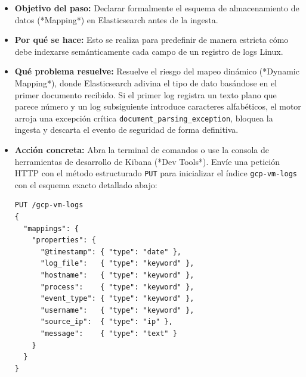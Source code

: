 \documentclass[
  coursetitle={Cómputo Nube y Tecnologías Emergentes},
  coursehours={96},
  coursedate={Verano 2026},
  doctype={Práctica},
  otherlangs={english,french},
  authorname={Lázaro},
  authorsurname={Bustio-Martínez},
  authortitle={PhD},
  role={Profesor Investigador},
  email={lbustio@inaoe.mx},
  phone={5559504000},
  ext={7459},
  institution={Instituto Nacional de Astrofísica, Óptica y Electrónica (INAOE)},
  department={Maestría en Ciencias en Tecnologías de Seguridad},
  address={Luis Enrique Erro 1, Sta. Ma. Tonantzintla, San Andrés Cholula, CP 72840, Puebla, México},
  margin={0.5in}
]{../../lbustio_lecture_notes}
\begin{document}
\begin{itemize}
    \item \textbf{Objetivo del paso:} Declarar formalmente el esquema de almacenamiento de datos (*Mapping*) en Elasticsearch antes de la ingesta.
    \item \textbf{Por qué se hace:} Esto se realiza para predefinir de manera estricta cómo debe indexarse semánticamente cada campo de un registro de logs Linux.
    \item \textbf{Qué problema resuelve:} Resuelve el riesgo del mapeo dinámico (*Dynamic Mapping*), donde Elasticsearch adivina el tipo de dato basándose en el primer documento recibido. Si el primer log registra un texto plano que parece número y un log subsiguiente introduce caracteres alfabéticos, el motor arroja una excepción crítica \texttt{document\_parsing\_exception}, bloquea la ingesta y descarta el evento de seguridad de forma definitiva.
    \item \textbf{Acción concreta:} Abra la terminal de comandos o use la consola de herramientas de desarrollo de Kibana (*Dev Tools*). Envíe una petición HTTP con el método estructurado \texttt{PUT} para inicializar el índice \texttt{gcp-vm-logs} con el esquema exacto detallado abajo:
    
\begin{verbatim}
PUT /gcp-vm-logs
{
  "mappings": {
    "properties": {
      "@timestamp": { "type": "date" },
      "log_file":   { "type": "keyword" },
      "hostname":   { "type": "keyword" },
      "process":    { "type": "keyword" },
      "event_type": { "type": "keyword" },
      "username":   { "type": "keyword" },
      "source_ip":  { "type": "ip" },
      "message":    { "type": "text" }
    }
  }
}
\end{verbatim}


\end{itemize}
\end{document}

